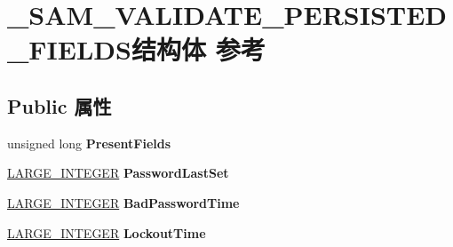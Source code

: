 \hypertarget{struct___s_a_m___v_a_l_i_d_a_t_e___p_e_r_s_i_s_t_e_d___f_i_e_l_d_s}{}\section{\+\_\+\+S\+A\+M\+\_\+\+V\+A\+L\+I\+D\+A\+T\+E\+\_\+\+P\+E\+R\+S\+I\+S\+T\+E\+D\+\_\+\+F\+I\+E\+L\+D\+S结构体 参考}
\label{struct___s_a_m___v_a_l_i_d_a_t_e___p_e_r_s_i_s_t_e_d___f_i_e_l_d_s}
\subsection*{Public 属性}
\begin{DoxyCompactItemize}
\item 
\mbox{\label{struct___s_a_m___v_a_l_i_d_a_t_e___p_e_r_s_i_s_t_e_d___f_i_e_l_d_s_a899c5106fd437c66aa722cd977f80b7d}} 
unsigned long {\bfseries Present\+Fields}
\item 
\mbox{\label{struct___s_a_m___v_a_l_i_d_a_t_e___p_e_r_s_i_s_t_e_d___f_i_e_l_d_s_af85eb5bada42b82a3c01e41f863b6934}} 
\hyperlink{union___l_a_r_g_e___i_n_t_e_g_e_r}{L\+A\+R\+G\+E\+\_\+\+I\+N\+T\+E\+G\+ER} {\bfseries Password\+Last\+Set}
\item 
\mbox{\label{struct___s_a_m___v_a_l_i_d_a_t_e___p_e_r_s_i_s_t_e_d___f_i_e_l_d_s_a809878b48f5640bf7de20c74edf9bfa1}} 
\hyperlink{union___l_a_r_g_e___i_n_t_e_g_e_r}{L\+A\+R\+G\+E\+\_\+\+I\+N\+T\+E\+G\+ER} {\bfseries Bad\+Password\+Time}
\item 
\mbox{\label{struct___s_a_m___v_a_l_i_d_a_t_e___p_e_r_s_i_s_t_e_d___f_i_e_l_d_s_a5e32ea7ca8a597af7586f871ccd25c98}} 
\hyperlink{union___l_a_r_g_e___i_n_t_e_g_e_r}{L\+A\+R\+G\+E\+\_\+\+I\+N\+T\+E\+G\+ER} {\bfseries Lockout\+Time}
\item 
\mbox{\label{struct___s_a_m___v_a_l_i_d_a_t_e___p_e_r_s_i_s_t_e_d___f_i_e_l_d_s_a7e7191d2b0b38bdb484a5edb3f33248e}} 

\end{DoxyCompactItemize}
